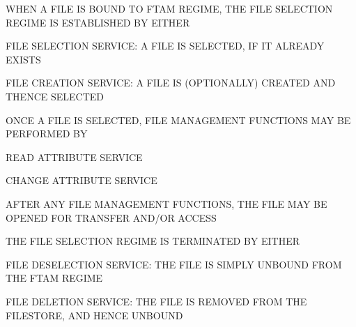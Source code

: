 \begin{bwslide}

\begin{nrtc}
\item	WHEN A FILE IS BOUND TO FTAM REGIME,
	THE FILE SELECTION REGIME IS ESTABLISHED BY EITHER
    \begin{nrtc}
    \item	FILE SELECTION SERVICE:
		A FILE IS SELECTED, IF IT ALREADY EXISTS

    \item	FILE CREATION SERVICE:
		A FILE IS (OPTIONALLY) CREATED AND THENCE SELECTED
    \end{nrtc}

\item	ONCE A FILE IS SELECTED,
	FILE MANAGEMENT FUNCTIONS MAY BE PERFORMED BY
    \begin{nrtc}
    \item	READ ATTRIBUTE SERVICE

    \item	CHANGE ATTRIBUTE SERVICE
    \end{nrtc}

\item	AFTER ANY FILE MANAGEMENT FUNCTIONS,
	THE FILE MAY BE OPENED FOR TRANSFER AND/OR ACCESS
\end{nrtc}
\end{bwslide}


\begin{bwslide}

\begin{nrtc}
\item	THE FILE SELECTION REGIME IS TERMINATED BY EITHER
    \begin{nrtc}
    \item	FILE DESELECTION SERVICE:
		THE FILE IS SIMPLY UNBOUND FROM THE FTAM REGIME

    \item	FILE DELETION SERVICE:
		THE FILE IS REMOVED FROM THE FILESTORE, AND HENCE UNBOUND
    \end{nrtc}
\end{nrtc}
\end{bwslide}


